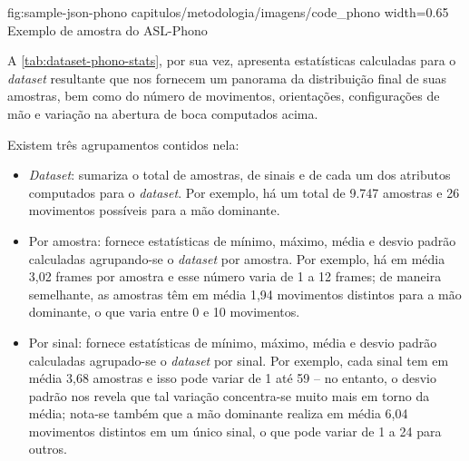 \figura
{fig:sample-json-phono} %
{capitulos/metodologia/imagens/code_phono} %
{width=0.65\linewidth} %
{Exemplo de amostra do ASL-Phono} %
{} %


A \autoref{tab:dataset-phono-stats}, por sua vez, apresenta estatísticas calculadas para o \textit{dataset} resultante que nos fornecem um panorama da distribuição final de suas amostras, bem como do número de movimentos, orientações, configurações de mão e variação na abertura de boca computados acima.




Existem três agrupamentos contidos nela:

\begin{itemize}
    \item \textit{Dataset}: sumariza o total de amostras, de sinais e de cada um dos atributos computados para o \textit{dataset}.
          Por exemplo, há um total de 9.747 amostras e 26 movimentos possíveis para a mão dominante.

    \item Por amostra: fornece estatísticas de mínimo, máximo, média e desvio padrão calculadas agrupando-se o \textit{dataset} por amostra.
          Por exemplo, há em média 3,02 frames por amostra e esse número varia de 1 a 12 frames; de maneira semelhante, as amostras têm em média 1,94 movimentos distintos para a mão dominante, o que varia entre 0 e 10 movimentos.


    \item Por sinal: fornece estatísticas de mínimo, máximo, média e desvio padrão calculadas agrupado-se o \textit{dataset} por sinal.
          Por exemplo, cada sinal tem em média 3,68 amostras e isso pode variar de 1 até 59 -- no entanto, o desvio padrão nos revela que tal variação concentra-se muito mais em torno da média; nota-se também que a mão dominante realiza em média 6,04 movimentos distintos em um único sinal, o que pode variar de 1 a 24 para outros.

\end{itemize}


